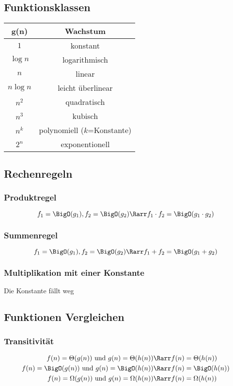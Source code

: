 \documentclass[a4paper]{article}
\begin{document}
		\subsection{Funktionsklassen}
		\begin{center}
			
		
		\begin{tabular} {c c}
			\hline
			g(n) & \textbf{Wachstum} \\
			\hline
			$1$ & konstant \\
			$\log n$ & logarithmisch \\
			$n$ & linear \\
			$n\log n$ & leicht überlinear \\
			$n^2$ & quadratisch \\
			$n^3$ & kubisch \\
			$n^k$ & polynomiell ($k$=Konstante) \\
			$2^n$ & exponentionell
		\end{tabular}
		\end{center} 
		\subsection{Rechenregeln}
		\subsubsection{Produktregel}
		$$f_1=\BigO(g_1),f_2=\BigO(g_2)\Rarr f_1\cdot f_2 =\BigO(g_1\cdot g_2)$$
		\subsubsection{Summenregel}
		$$f_1=\BigO(g_1),f_2=\BigO(g_2)\Rarr f_1+f_2=\BigO(g_1+g_2)$$
		\subsubsection{Multiplikation mit einer Konstante}		
		Die Konstante fällt weg
		\subsection{Funktionen Vergleichen}
		\subsubsection{Transitivität}
		\begin{align*}
			f(n)=\Theta(g(n)) \text{ und } g(n)=\Theta(h(n)) &\Rarr f(n)=\Theta(h(n)) \\
			f(n)=\BigO(g(n)) \text{ und } g(n)=\BigO(h(n)) &\Rarr f(n)=\BigO(h(n)) \\
			f(n)=\Omega(g(n)) \text{ und } g(n)=\Omega(h(n)) &\Rarr f(n)=\Omega(h(n))
		\end{align*}
\end{document}
